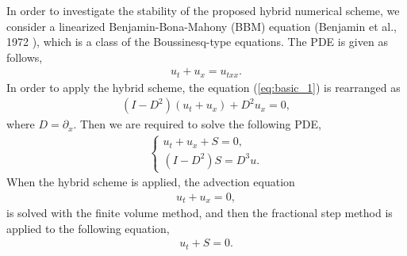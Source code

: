 \documentclass[review]{elsarticle}
\begin{document}
In order to investigate the stability of the proposed hybrid numerical scheme,
we consider a linearized Benjamin-Bona-Mahony (BBM)
equation (Benjamin et al., 1972 \cite{benjamin1972model}),
which is a class of the Boussinesq-type equations. 
The PDE is given as follows,
\begin{align}
u_t + u_x = u_{txx}.
\label{eq:basic_1}
\end{align}
In order to apply the hybrid scheme,
the equation (\ref{eq:basic_1}) is rearranged as
\begin{align}
(I-D^2)(u_t + u_x) +D^2u_x = 0, \label{eq:basic_2}
\end{align}
where $D=\partial_x$.
Then we are required to solve the following PDE,
\begin{align}
\left\{
\begin{array}{l}
u_t + u_x + S = 0, \\
\left(I-D^2 \right)S = D^3 u .
\end{array}
\right.
\end{align}
When the hybrid scheme is applied, the advection equation
\begin{align}
u_t + u_x = 0,
\label{eq:append_advec}
\end{align}
is solved with the finite volume method, 
and then the fractional step method is applied to
the following equation,
\begin{align*}
u_t + S = 0.
\end{align*}
\end{document}

